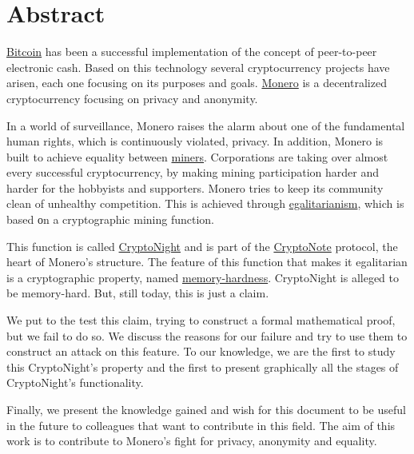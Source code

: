 %
%
\restoregeometry

\thispagestyle{empty}
\chapter*{Abstract}
\hyperref[sec:Bitcoin]{Bitcoin} has been a successful implementation of the concept of peer-to-peer electronic cash. Based on this technology several cryptocurrency projects have arisen, each one focusing on its purposes and goals. \hyperref[sec:Monero]{Monero} is a decentralized cryptocurrency focusing on privacy and anonymity.

In a world of surveillance, Monero raises the alarm about one of the fundamental human rights, which is continuously violated, privacy. In addition, Monero is built to achieve equality between \hyperref[sec:mining]{miners}. Corporations are taking over almost every successful cryptocurrency, by making mining participation harder and harder for the hobbyists and supporters. Monero tries to keep its community clean of unhealthy competition. This is achieved through \hyperref[sec:egalitarian]{egalitarianism}, which is based οn a cryptographic mining function.

This function is called \hyperref[ch:cryptonight]{CryptoNight} and is part of the \hyperref[sec:CryptoNote]{CryptoNote} protocol, the heart of Monero's structure. The feature of this function that makes it egalitarian is a cryptographic property, named \hyperref[sec:memory-hard]{memory-hardness}. CryptoNight is alleged to be memory-hard. But, still today, this is just a claim.

We put to the test this claim, trying to construct a formal mathematical proof, but we fail to do so. We discuss the reasons for our failure and try to use them to construct an attack on this feature. To our knowledge, we are the first to study this CryptoNight's property and the first to present graphically all the stages of CryptoNight's functionality.

Finally, we present the knowledge gained and wish for this document to be useful in the future to colleagues that want to contribute in this field. The aim of this work is to contribute to Monero's fight for privacy, anonymity and equality.
\clearpage
%
%
\thispagestyle{empty}
\null
\clearpage
